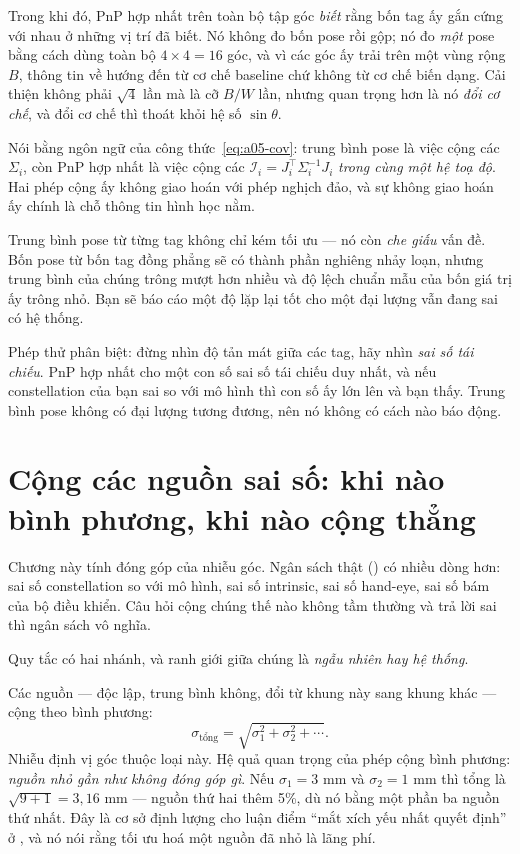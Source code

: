 \documentclass[../../marker.tex]{subfiles}
\begin{document}
Trong khi đó, PnP hợp nhất trên toàn bộ tập góc \emph{biết} rằng bốn tag ấy gắn cứng với nhau ở những vị trí đã biết. Nó không đo bốn pose rồi gộp; nó đo \emph{một} pose bằng cách dùng toàn bộ \(4\times4 = 16\) góc, và vì các góc ấy trải trên một vùng rộng \(B\), thông tin về hướng đến từ cơ chế baseline chứ không từ cơ chế biến dạng. Cải thiện không phải \(\sqrt{4}\) lần mà là cỡ \(B/W\) lần, nhưng quan trọng hơn là nó \emph{đổi cơ chế}, và đổi cơ chế thì thoát khỏi hệ số \(\sin\theta\).

Nói bằng ngôn ngữ của công thức~\eqref{eq:a05-cov}: trung bình pose là việc cộng các \(\Sigma_i\), còn PnP hợp nhất là việc cộng các \(\mathcal{I}_i = J_i^{\top}\Sigma_i^{-1}J_i\) \emph{trong cùng một hệ toạ độ}. Hai phép cộng ấy không giao hoán với phép nghịch đảo, và sự không giao hoán ấy chính là chỗ thông tin hình học nằm.

\begin{cambay}
Trung bình pose từ từng tag không chỉ kém tối ưu --- nó còn \emph{che giấu} vấn đề. Bốn pose từ bốn tag đồng phẳng sẽ có thành phần nghiêng nhảy loạn, nhưng trung bình của chúng trông mượt hơn nhiều và độ lệch chuẩn mẫu của bốn giá trị ấy trông nhỏ. Bạn sẽ báo cáo một độ lặp lại tốt cho một đại lượng vẫn đang sai có hệ thống.

Phép thử phân biệt: đừng nhìn độ tản mát giữa các tag, hãy nhìn \emph{sai số tái chiếu}. PnP hợp nhất cho một con số sai số tái chiếu duy nhất, và nếu constellation của bạn sai so với mô hình thì con số ấy lớn lên và bạn thấy. Trung bình pose không có đại lượng tương đương, nên nó không có cách nào báo động.
\end{cambay}

\section{Cộng các nguồn sai số: khi nào bình phương, khi nào cộng thẳng}

Chương này tính đóng góp của nhiễu góc. Ngân sách thật () có nhiều dòng hơn: sai số constellation so với mô hình, sai số intrinsic, sai số hand-eye, sai số bám của bộ điều khiển. Câu hỏi cộng chúng thế nào không tầm thường và trả lời sai thì ngân sách vô nghĩa.

Quy tắc có hai nhánh, và ranh giới giữa chúng là \emph{ngẫu nhiên hay hệ thống}.

Các nguồn  --- độc lập, trung bình không, đổi từ khung này sang khung khác --- cộng theo bình phương:
\[
\sigma_{\text{tổng}} = \sqrt{\sigma_1^2 + \sigma_2^2 + \cdots}.
\]
Nhiễu định vị góc thuộc loại này. Hệ quả quan trọng của phép cộng bình phương: \emph{nguồn nhỏ gần như không đóng góp gì}. Nếu \(\sigma_1 = 3\) mm và \(\sigma_2 = 1\) mm thì tổng là \(\sqrt{9+1} = 3{,}16\) mm --- nguồn thứ hai thêm 5\%, dù nó bằng một phần ba nguồn thứ nhất. Đây là cơ sở định lượng cho luận điểm ``mắt xích yếu nhất quyết định'' ở , và nó nói rằng tối ưu hoá một nguồn đã nhỏ là lãng phí.
\end{document}
